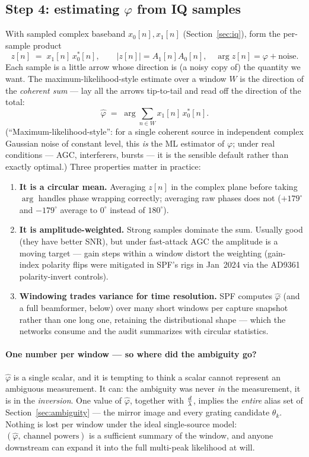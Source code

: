 \subsection{Step 4: estimating $\varphi$ from IQ samples}
\label{sec:estimation}

With sampled complex baseband $x_0[n], x_1[n]$ (Section~\ref{sec:iq}), form
the per-sample product
\[
z[n] \;=\; x_1[n]\, x_0^{*}[n],
\qquad
|z[n]| = A_1[n] A_0[n], \quad \arg z[n] = \varphi + \text{noise}.
\]
Each sample is a little arrow whose direction is (a noisy copy of) the
quantity we want. The maximum-likelihood-style estimate over a window $W$ is
the direction of the \emph{coherent sum} --- lay all the arrows tip-to-tail
and read off the direction of the total:
\[
\hat\varphi \;=\; \arg \sum_{n \in W} x_1[n]\, x_0^{*}[n].
\]
(``Maximum-likelihood-style'': for a single coherent source in independent
complex Gaussian noise of constant level, this \emph{is} the ML estimator of
$\varphi$; under real conditions --- AGC, interferers, bursts --- it is the
sensible default rather than exactly optimal.)
Three properties matter in practice:
\begin{enumerate}
  \item \textbf{It is a circular mean.} Averaging $z[n]$ in the complex plane
        before taking $\arg$ handles phase wrapping correctly; averaging raw
        phases does not ($+179^\circ$ and $-179^\circ$ average to $0^\circ$
        instead of $180^\circ$).
  \item \textbf{It is amplitude-weighted.} Strong samples dominate the sum.
        Usually good (they have better SNR), but under fast-attack AGC the
        amplitude is a moving target --- gain steps within a window distort
        the weighting (gain-index polarity flips were mitigated in SPF's rigs
        in Jan~2024 via the AD9361 polarity-invert controls).
  \item \textbf{Windowing trades variance for time resolution.} SPF computes
        $\hat\varphi$ (and a full beamformer, below) over many short windows
        per capture snapshot rather than one long one, retaining the
        distributional shape --- which the networks consume and the audit
        summarizes with circular statistics.
\end{enumerate}

\paragraph{One number per window --- so where did the ambiguity go?}
$\hat\varphi$ is a single scalar, and it is tempting to think a scalar cannot
represent an ambiguous measurement. It can: the ambiguity was never \emph{in}
the measurement, it is in the \emph{inversion}. One value of $\hat\varphi$,
together with $\tfrac{d}{\lambda}$, implies the \emph{entire} alias set of
Section~\ref{sec:ambiguity} --- the mirror image and every grating candidate
$\theta_k$. Nothing is lost per window under the ideal single-source model:
$(\hat\varphi,\ \text{channel powers})$ is a sufficient summary of the
window, and anyone downstream can expand it into the full multi-peak
likelihood at will.

